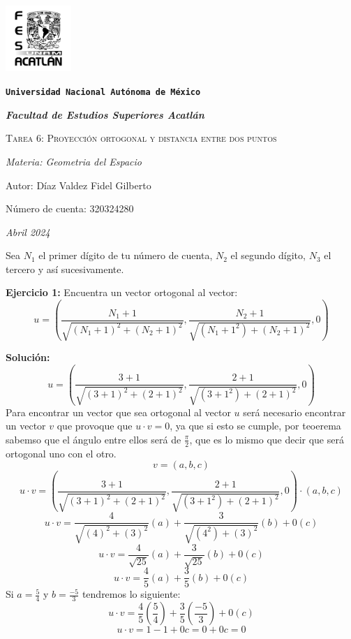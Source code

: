 \documentclass{article}
\begin{document}
\begin{titlepage}
    \centering   
    {\includegraphics[width=2.5cm]{logo.png}\par}
    {\texttt{\bfseries \LARGE Universidad Nacional Autónoma de México} \par}
    \vspace{1cm}
    {\itshape \Large \bfseries Facultad de Estudios Superiores Acatlán \par}
    \vspace{3cm}
    {\scshape \Huge Tarea 6: Proyección ortogonal y distancia entre dos puntos \par}
    \vspace {3cm}
    {\slshape \Large Materia: Geometria del Espacio \par}
    \vspace{2cm}
    {\Large Autor: Díaz Valdez Fidel Gilberto\par}
    {\Large Número de cuenta: 320324280\par}
    \vfill
    {\itshape Abril 2024 \par}
 \end{titlepage}

 Sea $N_1$ el primer dígito de tu número de cuenta, $N_2$ el segundo dígito, $N_3$ el tercero y así
sucesivamente.
\vspace{10pt}


\textbf{Ejercicio 1:} Encuentra un vector ortogonal al vector:
$$u = (\frac{N_1+1}{\sqrt{(N_1+1)^2+ (N_2+1)^2}}, \frac{N_2+1}{\sqrt{(N_1+1^2)+ (N_2+1)^2}} , 0)$$

\textbf{Solución:}
$$u = (\frac{3+1}{\sqrt{(3+1)^2+ (2+1)^2}}, \frac{2+1}{\sqrt{(3+1^2)+ (2+1)^2}} , 0)$$
Para encontrar un vector que sea ortogonal al vector $u$ será necesario encontrar un vector $v$ que provoque que $u \cdot v =0$, ya que 
si esto se cumple, por teoerema sabemso que el ángulo entre ellos será de $\frac{\pi}{2}$, que es lo mismo que decir que será 
ortogonal uno con el otro. 
    $$v = (a, b, c)$$
    $$u \cdot v = (\frac{3+1}{\sqrt{(3+1)^2+ (2+1)^2}}, \frac{2+1}{\sqrt{(3+1^2)+ (2+1)^2}} , 0) \cdot (a, b,c )$$
    $$u \cdot v = \frac{4}{\sqrt{(4)^2+ (3)^2}} (a) + \frac{3}{\sqrt{(4^2)+ (3)^2}}(b) + 0(c)$$
    $$u \cdot v = \frac{4}{\sqrt{25}} (a) + \frac{3}{\sqrt{25}}(b) + 0(c)$$
    $$u \cdot v = \frac{4}{5} (a) + \frac{3}{5}(b) + 0(c)$$
Si $a = \frac{5}{4}$ y $b = \frac{-5}{3}$ tendremos lo siguiente:
$$u \cdot v = \frac{4}{5}(\frac{5}{4}) + \frac{3}{5}(\frac{-5}{3}) + 0(c)$$
$$u \cdot v = 1 -1 + 0c = 0 + 0c = 0 $$
\end{document}
